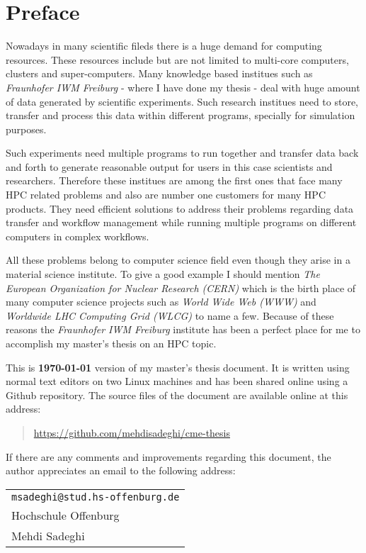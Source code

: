 \chapter{Preface}
\label{cha:preface}

Nowadays in many scientific fileds there is a huge demand for computing resources.
These resources include but are not limited to multi-core computers, clusters and
super-computers.
Many knowledge based institues such as \textit{Fraunhofer IWM Freiburg} - where I have 
done my thesis - 
deal with huge amount of data generated by scientific experiments. Such research 
institues need to store, transfer and process this data within different
programs, specially for simulation purposes.

Such experiments need multiple programs
to run together and transfer data back and forth to generate reasonable output for
users in this case scientists and researchers. Therefore these institues are 
among the first ones that face many HPC related problems and also are number one
customers for many HPC products. They need efficient solutions to address their 
problems regarding data transfer and workflow management while running multiple 
programs on different computers in complex workflows. 

All these problems belong to computer science field even though they arise 
in a material science institute. To give a good example I should mention \emph{The
European Organization for Nuclear Research (CERN)} which is the birth place of many 
computer science projects such as
\emph{World Wide Web (WWW)} and \emph{Worldwide LHC Computing Grid (WLCG)} to name a
few. Because of these reasons the \emph{Fraunhofer IWM Freiburg} institute has been a perfect 
place for me to accomplish my master's thesis on an HPC topic.

This is \textbf{\today} version of my master's thesis document. It is written using 
normal text editors on two Linux machines and has been shared 
online using a Github repository. The source files of the document are available 
online at this address:

%
\begin{quote}
\url{https://github.com/mehdisadeghi/cme-thesis}
\end{quote}
%

If there are any comments and improvements regarding this document, the author
appreciates an email to the following address:

\begin{center}
\begin{tabular}{l}
\nolinkurl{msadeghi@stud.hs-offenburg.de} \\
Hochschule Offenburg\\
Mehdi Sadeghi
\end{tabular}
\end{center}




